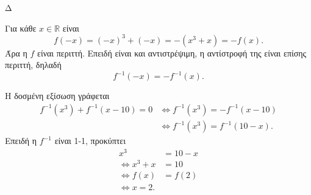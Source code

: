 \begin{thema}{Δ}
\begin{erwthma}
\item Για κάθε $x\in\mathbb{R}$ είναι
\[
f(-x)=(-x)^3+(-x)=-(x^3+x)=-f(x).
\]
Άρα η $f$ είναι περιττή. Επειδή είναι και αντιστρέψιμη, η αντίστροφή της είναι επίσης περιττή, δηλαδή
\[
f^{-1}(-x)=-f^{-1}(x).
\]

Η δοσμένη εξίσωση γράφεται
\begin{align*}
f^{-1}(x^3)+f^{-1}(x-10)=0
&\Leftrightarrow f^{-1}(x^3)=-f^{-1}(x-10)\\
&\Leftrightarrow f^{-1}(x^3)=f^{-1}(10-x).
\end{align*}
Επειδή η $f^{-1}$ είναι 1-1, προκύπτει
\begin{align*}
x^3&=10-x\\
\Leftrightarrow x^3+x&=10\\
\Leftrightarrow f(x)&=f(2)\\
\Leftrightarrow {x=2}.
\end{align*}
\end{erwthma}
\end{thema}

